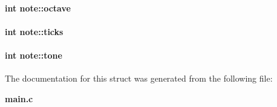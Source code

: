 \paragraph[{octave}]{\setlength{\rightskip}{0pt plus 5cm}int note\+::octave}\label{structnote_a8b58f133e02c3ea4ec40ee641b654dcf}
\paragraph[{ticks}]{\setlength{\rightskip}{0pt plus 5cm}int note\+::ticks}\label{structnote_a7dd3a334a8a3f52abeb1a4f5822cc05c}
\paragraph[{tone}]{\setlength{\rightskip}{0pt plus 5cm}int note\+::tone}\label{structnote_a30832d96c968d682e5838b39370a1908}


The documentation for this struct was generated from the following file\+:\begin{DoxyCompactItemize}
\item 
{\bf main.\+c}\end{DoxyCompactItemize}
